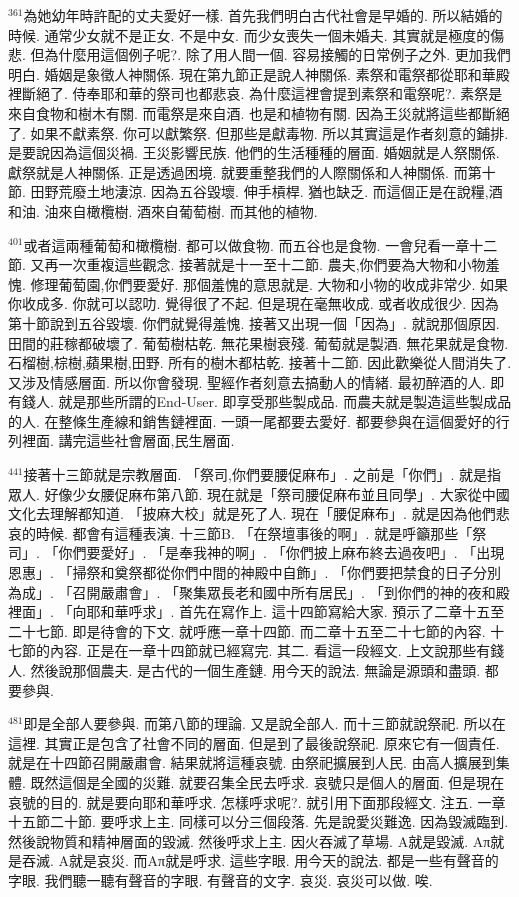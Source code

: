 \documentclass{book}
\begin{document}
$^{361}$為她幼年時許配的丈夫愛好一樣.
首先我們明白古代社會是早婚的.
所以結婚的時候.
通常少女就不是正女.
不是中女.
而少女喪失一個未婚夫.
其實就是極度的傷悲.
但為什麼用這個例子呢?.
除了用人間一個.
容易接觸的日常例子之外.
更加我們明白.
婚姻是象徵人神關係.
現在第九節正是說人神關係.
素祭和電祭都從耶和華殿裡斷絕了.
侍奉耶和華的祭司也都悲哀.
為什麼這裡會提到素祭和電祭呢?.
素祭是來自食物和樹木有關.
而電祭是來自酒.
也是和植物有關.
因為王災就將這些都斷絕了.
如果不獻素祭.
你可以獻繁祭.
但那些是獻毒物.
所以其實這是作者刻意的鋪排.
是要說因為這個災禍.
王災影響民族.
他們的生活種種的層面.
婚姻就是人祭關係.
獻祭就是人神關係.
正是透過困境.
就要重整我們的人際關係和人神關係.
而第十節.
田野荒廢土地淒涼.
因為五谷毀壞.
伸手槓桿.
猶也缺乏.
而這個正是在說糧,酒和油.
油來自橄欖樹.
酒來自葡萄樹.
而其他的植物.

$^{401}$或者這兩種葡萄和橄欖樹.
都可以做食物.
而五谷也是食物.
一會兒看一章十二節.
又再一次重複這些觀念.
接著就是十一至十二節.
農夫,你們要為大物和小物羞愧.
修理葡萄園,你們要愛好.
那個羞愧的意思就是.
大物和小物的收成非常少.
如果你收成多.
你就可以認叻.
覺得很了不起.
但是現在毫無收成.
或者收成很少.
因為第十節說到五谷毀壞.
你們就覺得羞愧.
接著又出現一個「因為」.
就說那個原因.
田間的莊稼都破壞了.
葡萄樹枯乾.
無花果樹衰殘.
葡萄就是製酒.
無花果就是食物.
石榴樹,棕樹,蘋果樹,田野.
所有的樹木都枯乾.
接著十二節.
因此歡樂從人間消失了.
又涉及情感層面.
所以你會發現.
聖經作者刻意去搞動人的情緒.
最初醉酒的人.
即有錢人.
就是那些所謂的End-User.
即享受那些製成品.
而農夫就是製造這些製成品的人.
在整條生產線和銷售鏈裡面.
一頭一尾都要去愛好.
都要參與在這個愛好的行列裡面.
講完這些社會層面,民生層面.

$^{441}$接著十三節就是宗教層面.
「祭司,你們要腰促麻布」.
之前是「你們」.
就是指眾人.
好像少女腰促麻布第八節.
現在就是「祭司腰促麻布並且同學」.
大家從中國文化去理解都知道.
「披麻大校」就是死了人.
現在「腰促麻布」.
就是因為他們悲哀的時候.
都會有這種表演.
十三節B.
「在祭壇事後的啊」.
就是呼籲那些「祭司」.
「你們要愛好」.
「是奉我神的啊」.
「你們披上麻布終去過夜吧」.
「出現恩惠」.
「掃祭和奠祭都從你們中間的神殿中自飾」.
「你們要把禁食的日子分別為成」.
「召開嚴肅會」.
「聚集眾長老和國中所有居民」.
「到你們的神的夜和殿裡面」.
「向耶和華呼求」.
首先在寫作上.
這十四節寫給大家.
預示了二章十五至二十七節.
即是待會的下文.
就呼應一章十四節.
而二章十五至二十七節的內容.
十七節的內容.
正是在一章十四節就已經寫完.
其二.
看這一段經文.
上文說那些有錢人.
然後說那個農夫.
是古代的一個生產鏈.
用今天的說法.
無論是源頭和盡頭.
都要參與.

$^{481}$即是全部人要參與.
而第八節的理論.
又是說全部人.
而十三節就說祭祀.
所以在這裡.
其實正是包含了社會不同的層面.
但是到了最後說祭祀.
原來它有一個責任.
就是在十四節召開嚴肅會.
結果就將這種哀號.
由祭祀擴展到人民.
由高人擴展到集體.
既然這個是全國的災難.
就要召集全民去呼求.
哀號只是個人的層面.
但是現在哀號的目的.
就是要向耶和華呼求.
怎樣呼求呢?.
就引用下面那段經文.
注五.
一章十五節二十節.
要呼求上主.
同樣可以分三個段落.
先是說愛災難逸.
因為毀滅臨到.
然後說物質和精神層面的毀滅.
然後呼求上主.
因火吞滅了草場.
A就是毀滅.
Aπ就是吞滅.
A就是哀災.
而Aπ就是呼求.
這些字眼.
用今天的說法.
都是一些有聲音的字眼.
我們聽一聽有聲音的字眼.
有聲音的文字.
哀災.
哀災可以做.
唉.
\end{document}
